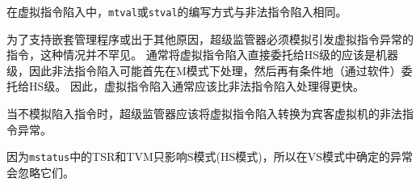 在虚拟指令陷入中，{\tt mtval}或{\tt stval}的编写方式与非法指令陷入相同。

\begin{commentary}
  为了支持嵌套管理程序或出于其他原因，超级监管器必须模拟引发虚拟指令异常的指令，这种情况并不罕见。
  通常将虚拟指令陷入直接委托给HS级的应该是机器级，因此非法指令陷入可能首先在M模式下处理，然后再有条件地（通过软件）委托给HS级。
  因此，虚拟指令陷入通常应该比非法指令陷入处理得更快。

当不模拟陷入指令时，超级监管器应该将虚拟指令陷入转换为宾客虚拟机的非法指令异常。
\end{commentary}

\begin{commentary}
  因为{\tt mstatus}中的TSR和TVM只影响S模式(HS模式)，所以在VS模式中确定的异常会忽略它们。
\end{commentary}

